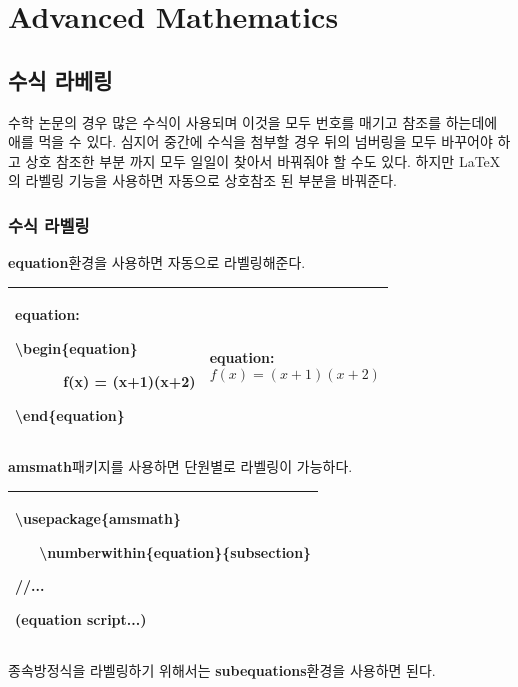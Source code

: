 \documentclass[12pt]{article}
\begin{document}
	\section{Advanced Mathematics}
	\subsection{수식 라베링}
	수학 논문의 경우 많은 수식이 사용되며 이것을 모두 번호를 매기고 참조를 하는데에 애를 먹을 수 있다. 심지어 중간에 수식을 첨부할 경우 뒤의 넘버링을 모두 바꾸어야 하고 상호 참조한 부분 까지 모두 일일이 찾아서 바꿔줘야 할 수도 있다. 하지만 \LaTeX 의 라벨링 기능을 사용하면 자동으로 상호참조 된 부분을 바꿔준다.
	\subsubsection{수식 라벨링}
	\textbf{equation}환경을 사용하면 자동으로 라벨링\를 해준다.\newline
	
	\begin{tabularx}{\textwidth\onehalfspacing}{|X|X|}
		\hline
		equation:
		
		\textbackslash begin\{equation\}
		
		\ \ \ \ \ \ f(x) = (x+1)(x+2)
		
		\textbackslash end\{equation\}
		&equation:
		\begin{equation}
			f(x) = (x+1)(x+2)
		\end{equation}\\
		\hline
	\end{tabularx}
	\newline\newline
	\textbf{amsmath}패키지를 사용하면 단원별로 라벨링이 가능하다. \newline
	
	\begin{tabularx}{\textwidth\onehalfspacing}{|X|}
		\hline
		\textbackslash usepackage\{amsmath\}
		
		\ \ \ \textbackslash numberwithin\{equation\}\{subsection\}
		
		//...
		
		(equation script...)\\
		\hline
	\end{tabularx}
	\newline\newline
	종속방정식을 라벨링하기 위해서는 \textbf{subequations}환경을 사용하면 된다.\newline
	
\end{document}
